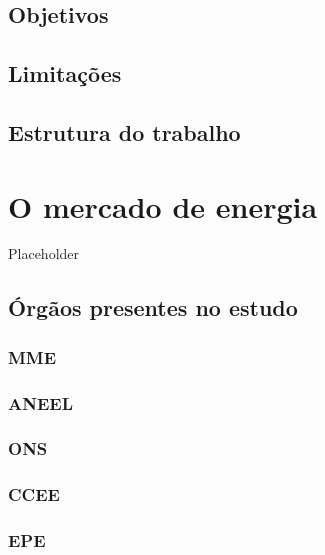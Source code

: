 \documentclass[grad,numbers]{coppe}
\begin{document}
  \hypertarget{objetivos}{%
  \section{Objetivos}\label{objetivos}}

  \hypertarget{limitauxe7uxf5es}{%
  \section{Limitações}\label{limitauxe7uxf5es}}

  \hypertarget{estrutura-do-trabalho}{%
  \section{Estrutura do trabalho}\label{estrutura-do-trabalho}}

  \hypertarget{o-mercado-de-energia}{%
  \chapter{O mercado de energia}\label{o-mercado-de-energia}}

  Placeholder

  \hypertarget{uxf3rguxe3os-presentes-no-estudo}{%
  \section{Órgãos presentes no estudo}\label{uxf3rguxe3os-presentes-no-estudo}}

  \hypertarget{mme}{%
  \subsection{MME}\label{mme}}

  \hypertarget{aneel}{%
  \subsection{ANEEL}\label{aneel}}

  \hypertarget{ons}{%
  \subsection{ONS}\label{ons}}

  \hypertarget{ccee}{%
  \subsection{CCEE}\label{ccee}}

  \hypertarget{epe}{%
  \subsection{EPE}\label{epe}}
\end{document}
